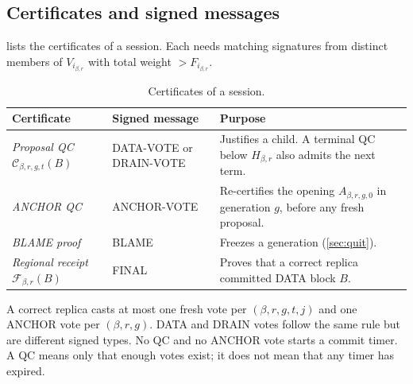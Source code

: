 \documentclass[11pt,a4paper]{article}
\newcommand{\QC}{\mathcal C}
\newcommand{\FC}{\mathcal F}
\newcommand{\defterm}[1]{\textcolor{rrBlue}{\textit{#1}}}
\begin{document}
\subsection{Certificates and signed messages}
\label{sec:certificates}
 lists the certificates of a session. Each needs
matching signatures from distinct members of $V_{i_{\beta,r}}$ with total
weight $>F_{i_{\beta,r}}$.

\begin{table}[htbp]\centering\small
\caption{Certificates of a session.}
\label{tab:certificates}
\begin{tabularx}{\linewidth}{@{}>{\raggedright\arraybackslash}p{.25\linewidth}>{\raggedright\arraybackslash}p{.24\linewidth}Y@{}}
\toprule
Certificate & Signed message & Purpose\\
\midrule
\defterm{Proposal QC} $\QC_{\beta,r,g,t}(B)$ & DATA-VOTE or DRAIN-VOTE & Justifies a
child. A terminal QC below $H_{\beta,r}$ also admits the next term.\\
\defterm{ANCHOR QC} & ANCHOR-VOTE & Re-certifies the opening $A_{\beta,r,g,0}$ in
generation $g$, before any fresh proposal.\\
\defterm{BLAME proof} & BLAME & Freezes a generation (\cref{sec:quit}).\\
\defterm{Regional receipt} $\FC_{\beta,r}(B)$ & FINAL & Proves that a correct replica
committed DATA block $B$.\\
\bottomrule
\end{tabularx}
\end{table}

A correct replica casts at most one fresh vote per $(\beta,r,g,t,j)$ and
one ANCHOR vote per $(\beta,r,g)$. DATA and DRAIN votes follow the same
rule but are different signed types. No QC and no ANCHOR vote starts a
commit timer. A QC means only that enough votes exist; it does not mean
that any timer has expired.
\end{document}
